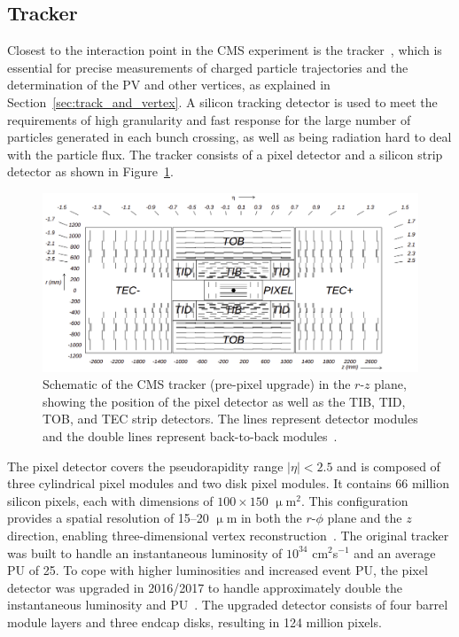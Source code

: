 \subsection{Tracker}

Closest to the interaction point in the \ac{CMS} experiment is the tracker~\cite{CMS_Setup,Malberti:2014pda,CMS:2012sda}, which is essential for precise measurements of charged particle trajectories and the determination of the \ac{PV} and other vertices, as explained in Section~\ref{sec:track_and_vertex}. 
A silicon tracking detector is used to meet the requirements of high granularity and fast response for the large number of particles generated in each bunch crossing, as well as being radiation hard to deal with the particle flux.
The tracker consists of a pixel detector and a silicon strip detector as shown in Figure~\ref{fig:tracker}. \\

\begin{figure}[!hbtp]
    \centering
    \includegraphics[width=\textwidth]{Figures/tracker.png}
    \caption[Diagram of the CMS tracker.]{Schematic of the CMS tracker (pre-pixel upgrade) in the $r$-$z$ plane, showing the position of the pixel detector as well as the TIB, TID, TOB, and TEC strip detectors. The lines represent detector modules and the double lines represent back-to-back modules~\cite{CMS_Setup}.}
    \label{fig:tracker}
\end{figure}

The pixel detector covers the pseudorapidity range $|\eta| < 2.5$ and is composed of three cylindrical pixel modules and two disk pixel modules. 
It contains 66 million silicon pixels, each with dimensions of $100 \times 150$ $\upmu$m${^2}$. 
This configuration provides a spatial resolution of 15--20 $\upmu$m in both the $r$-$\phi$ plane and the $z$ direction, enabling three-dimensional vertex reconstruction~\cite{CMS_Setup}.
The original tracker was built to handle an instantaneous luminosity of $10^{34}$ cm$^{2}$s$^{-1}$ and an average \ac{PU} of 25.
To cope with higher luminosities and increased event \ac{PU}, the pixel detector was upgraded in 2016/2017 to handle approximately double the instantaneous luminosity and \ac{PU}~\cite{CMS:2012sda}. 
The upgraded detector consists of four barrel module layers and three endcap disks, resulting in 124 million pixels. \\

